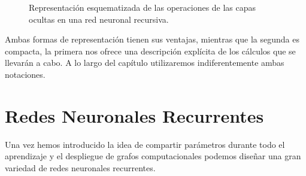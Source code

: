 \begin{enumerate}
	
	\begin{figure}[h!]
		\centering
		\caption{Representación esquematizada de las operaciones de las capas ocultas en una red neuronal recursiva.}
		\label{fig:forma2}
	\end{figure}

\end{enumerate}
	
	Ambas formas de representación tienen sus ventajas, mientras que la segunda es compacta, la primera nos ofrece una descripción explícita de los cálculos que se llevarán a cabo. A lo largo del capítulo utilizaremos indiferentemente ambas notaciones. 
	
	\section{Redes Neuronales Recurrentes}
	
	Una vez hemos introducido la idea de compartir parámetros durante todo el aprendizaje y el despliegue de grafos computacionales podemos diseñar una gran variedad de redes neuronales recurrentes. 
	
	
